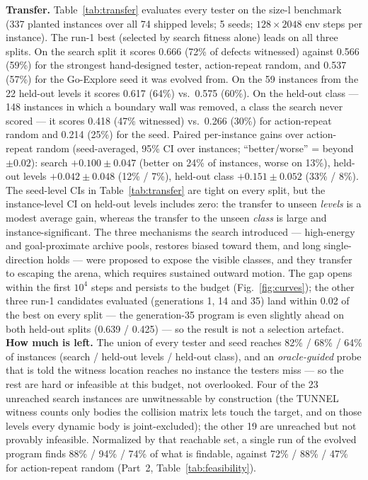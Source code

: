 \textbf{Transfer.} Table~\ref{tab:transfer} evaluates every tester on the size-l benchmark (337 planted instances over all 74 shipped
levels; 5 seeds; $128\times2048$ env steps per instance). The run-1 best (selected by search fitness alone) leads on all three splits.
On the search split it scores 0.666 (72\% of defects witnessed) against 0.566 (59\%) for the strongest hand-designed tester,
action-repeat random, and 0.537 (57\%) for the Go-Explore seed it was evolved from. On the 59 instances from the 22 held-out levels
it scores 0.617 (64\%) vs.\ 0.575 (60\%). On the held-out class --- 148 instances in which a boundary wall was removed, a class the
search never scored --- it scores 0.418 (47\% witnessed) vs.\ 0.266 (30\%) for action-repeat random and 0.214 (25\%) for the seed.
Paired per-instance gains over action-repeat random (seed-averaged, 95\% CI over instances; ``better/worse'' = beyond $\pm0.02$):
search $+0.100\pm0.047$ (better on 24\% of instances, worse on 13\%), held-out levels $+0.042\pm0.048$ (12\% / 7\%), held-out class
$+0.151\pm0.052$ (33\% / 8\%). The seed-level CIs in Table~\ref{tab:transfer} are tight on every split, but the instance-level CI on
held-out levels includes zero: the transfer to unseen \emph{levels} is a modest average gain, whereas the transfer to the unseen
\emph{class} is large and instance-significant. The three mechanisms the search introduced --- high-energy and goal-proximate archive
pools, restores biased toward them, and long single-direction holds --- were proposed to expose the visible classes, and they transfer
to escaping the arena, which requires sustained outward motion. The gap opens within the first $10^4$ steps and persists to the budget
(Fig.~\ref{fig:curves}); the other three run-1 candidates evaluated (generations 1, 14 and 35) land within 0.02 of the best on every split --- the
generation-35 program is even slightly ahead on both held-out splits (0.639 / 0.425) --- so the result is not a selection artefact. \textbf{How much is left.} The union of every tester and seed reaches 82\% / 68\% / 64\% of
instances (search / held-out levels / held-out class), and an \emph{oracle-guided} probe that is told the witness location reaches
no instance the testers miss --- so the rest are hard or infeasible at this budget, not overlooked. Four of the 23 unreached search
instances are unwitnessable by construction (the TUNNEL witness counts only bodies the collision matrix lets touch the target, and on
those levels every dynamic body is joint-excluded); the other 19 are unreached but not provably infeasible. Normalized by that reachable set,
a single run of the evolved program finds 88\% / 94\% / 74\% of what is findable, against 72\% / 88\% / 47\% for action-repeat random
(Part~2, Table~\ref{tab:feasibility}).


